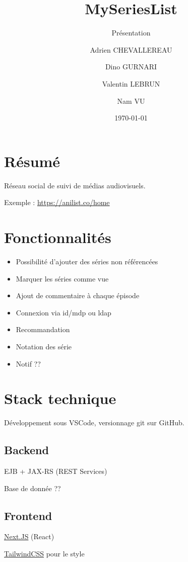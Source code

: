 \documentclass[headings=standardclasses,parskip=half]{scrartcl}
\title{MySeriesList}
\subtitle{Présentation}
\author{Adrien CHEVALLEREAU \and Dino GURNARI \and Valentin LEBRUN \and Nam VU}
\date{\today}
\begin{document}
\maketitle

\section*{Résumé}

Réseau social de suivi de médias audiovisuels.

Exemple : \url{https://anilist.co/home}

\section*{Fonctionnalités}

\begin{itemize}
    \item Possibilité d’ajouter des séries non référencées
    \item Marquer les séries comme vue
    \item Ajout de commentaire à chaque épisode
    \item Connexion via id/mdp ou ldap
    \item Recommandation
    \item Notation des série
    \item Notif ??
\end{itemize}

\section*{Stack technique}

Développement sous VSCode, versionnage git sur GitHub.

\subsection*{Backend}

EJB + JAX-RS (REST Services)

Base de donnée ??

\subsection*{Frontend}

\href{https://nextjs.org}{Next.JS} (React)

\href{https://tailwindcss.com}{TailwindCSS} pour le style
\end{document}
